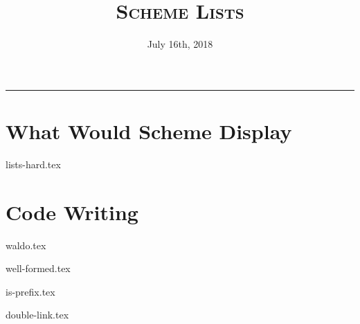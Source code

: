\documentclass{exam}
\title{\textsc{Scheme Lists}}
\date{July 16th, 2018}
\begin{document}
\maketitle
\rule{\textwidth}{0.15em}
\fontsize{12}{15}\selectfont


\begin{questions}

\section{What Would Scheme Display}
{lists-hard.tex}


\section{Code Writing}
{waldo.tex}

{well-formed.tex}

{is-prefix.tex}

{double-link.tex}


\end{questions}


\end{document}
